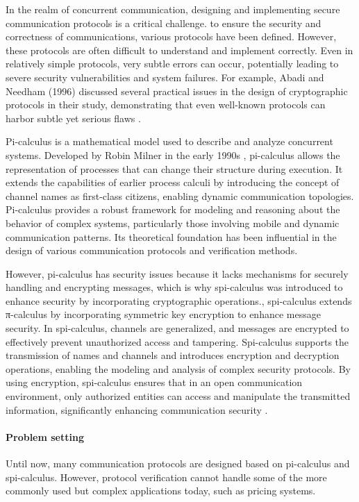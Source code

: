 \documentclass[master,english]{kuisthesis}
\begin{document}
In the realm of concurrent communication, designing and implementing secure communication protocols is a critical challenge. to ensure the security and correctness of communications, various protocols have been defined. However, these protocols are often difficult to understand and implement correctly. Even in relatively simple protocols, very subtle errors can occur, potentially leading to severe security vulnerabilities and system failures. For example, Abadi and Needham (1996) discussed several practical issues in the design of cryptographic protocols in their study, demonstrating that even well-known protocols can harbor subtle yet serious flaws \cite{?}.


Pi-calculus is a mathematical model used to describe and analyze concurrent systems. Developed by Robin Milner in the early 1990s \cite{?}, pi-calculus allows the representation of processes that can change their structure during execution. It extends the capabilities of earlier process calculi by introducing the concept of channel names as first-class citizens, enabling dynamic communication topologies. Pi-calculus provides a robust framework for modeling and reasoning about the behavior of complex systems, particularly those involving mobile and dynamic communication patterns. Its theoretical foundation has been influential in the design of various communication protocols and verification methods.

However, pi-calculus has security issues because it lacks mechanisms for securely handling and encrypting messages, which is why spi-calculus was introduced to enhance security by incorporating cryptographic operations., spi-calculus extends π-calculus by incorporating symmetric key encryption to enhance message security\cite{?}. In spi-calculus, channels are generalized, and messages are encrypted to effectively prevent unauthorized access and tampering. Spi-calculus supports the transmission of names and channels and introduces encryption and decryption operations, enabling the modeling and analysis of complex security protocols. By using encryption, spi-calculus ensures that in an open communication environment, only authorized entities can access and manipulate the transmitted information, significantly enhancing communication security \cite{?}.

\paragraph{Problem setting}
Until now, many communication protocols are designed based on pi-calculus and spi-calculus. However, protocol verification cannot handle some of the more commonly used but complex applications today, such as pricing systems.
\end{document}
